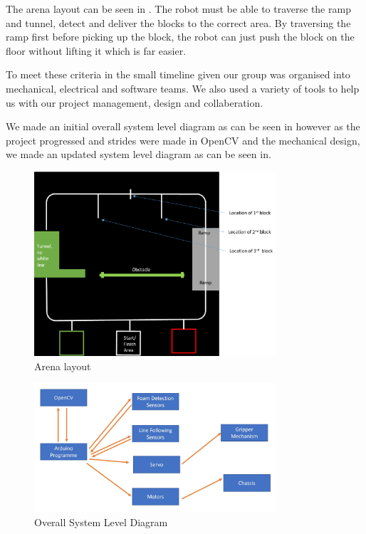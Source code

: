 \documentclass{article}
\begin{document}
\quad The arena layout can be seen in . The robot must be able to traverse the ramp and tunnel, detect and deliver the blocks to the correct area. By traversing the ramp first before picking up the block, the robot can just push the block on the floor without lifting it which is far easier.

\quad To meet these criteria in the small timeline given our group was organised into mechanical, electrical and software teams. We also used a variety of tools to help us with our project management, design and collaberation.

\quad We made an initial overall system level diagram as can be seen in  however as the project progressed and strides were made in OpenCV and the mechanical design, we made an updated system level diagram as can be seen in.

\begin{figure}[!h]
    \centering
    \includegraphics[width=0.8\textwidth]{assets/arena.png}
    \caption{Arena layout}
    \label{fig:arena}
\end{figure}

\begin{figure}[!h]
    \centering
    \includegraphics[width=0.8\textwidth]{assets/Overall_sys.jpg}
    \caption{Overall System Level Diagram}
    \label{fig:overall_sys}
\end{figure}
\end{document}
